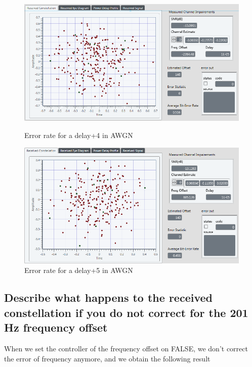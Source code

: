 \documentclass[frenchb, oneside, headings=normal]{scrartcl}
\begin{document}
\begin{figure}[!ht]
    \begin{minipage}[b]{0.48\linewidth}
        \centering \includegraphics[scale=0.45]{img/Sliding_correletaion_OFF_AWGN_5dB_shift_bit_4.PNG}
     \caption{Error rate for a delay+4 in AWGN}
     \label{fig5}
    \end{minipage}\hfill
    \begin{minipage}[b]{0.48\linewidth}
         \centering \includegraphics[scale=0.45]{img/Sliding_correletaion_OFF_AWGN_5dB_shift_bit_5.PNG}
 \caption{Error rate for a delay+5 in AWGN}\label{fig6}
    \end{minipage}
\end{figure}

\subsection{Describe what happens to the received constellation if you do not correct for the 201 Hz frequency offset}

When we set the controller of the frequency offset on FALSE, we don't correct the error of frequency anymore, and we obtain the following result
\end{document}
